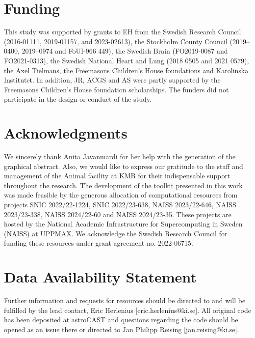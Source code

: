 \documentclass[utf8]{FrontiersinHarvard}
\begin{document}
    \section*{Funding}
    This study was supported by grants to EH from the Swedish Research Council (2016-01111, 2019-01157, and 2023-02613), the Stockholm County Council (2019–0400, 2019–0974 and FoUI-966 449), the Swedish Brain (FO2019-0087 and FO2021-0313), the Swedish National Heart and Lung (2018 0505 and 2021 0579), the Axel Tielmans, the Freemasons Children's House foundations and Karolinska Institutet. In addition, JR, ACGS and AS were partly supported by the Freemasons Children’s House foundation scholarships. The funders did not participate in the design or conduct of the study.

    \section*{Acknowledgments}
    We sincerely thank Anita Javanmardi for her help with the generation of the graphical abstract. Also, we would like to express our gratitude to the staff and management of the Animal facility at KMB for their indispensable support throughout the research. The development of the toolkit presented in this work was made feasible by the generous allocation of computational resources from projects SNIC 2022/22-1224, SNIC 2022/23-638, NAISS 2023/22-646, NAISS 2023/23-338, NAISS 2024/22-60 and NAISS 2024/23-35. These projects are hosted by the National Academic Infrastructure for Supercomputing in Sweden (NAISS) at UPPMAX. We acknowledge the Swedish Research Council for funding these resources under grant agreement no. 2022-06715.

    \section*{Data Availability Statement}
    Further information and requests for resources should be directed to and will be fulfilled by the lead contact, Eric Herlenius [eric.herlenius@ki.se]. All original code has been deposited at \href{https://github.com/janreising/astroCAST}{astroCAST} and questions regarding the code should be opened as an issue there or directed to Jan Philipp Reising [jan.reising@ki.se].

    
\end{document}
